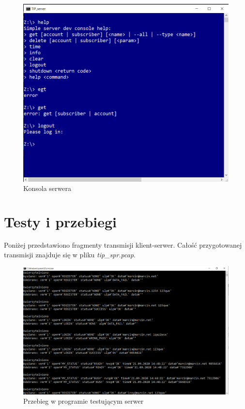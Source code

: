 \documentclass[12pt,a4paper]{article}
\begin{document}
	\begin{figure}[h!]
		\begin{center}
			\includegraphics*[width=.8\textwidth]{serwer_3.png}
		\end{center}
		\caption{Konsola serwera}
	\end{figure}
	
	
	
	\pagebreak
	\section{Testy i przebiegi}
	\par Poniżej przedstawiono fragmenty transmisji klient-serwer. Całość przygotowanej transmisji znajduje się w pliku
	\textit{tip\_spr.pcap}. 
	
	\begin{figure}[h!]
		\begin{center}
			\includegraphics*[width=.75\textwidth]{testy_1.png}
		\end{center}
		\caption{Przebieg w programie testującym serwer}
	\end{figure}
\end{document}
